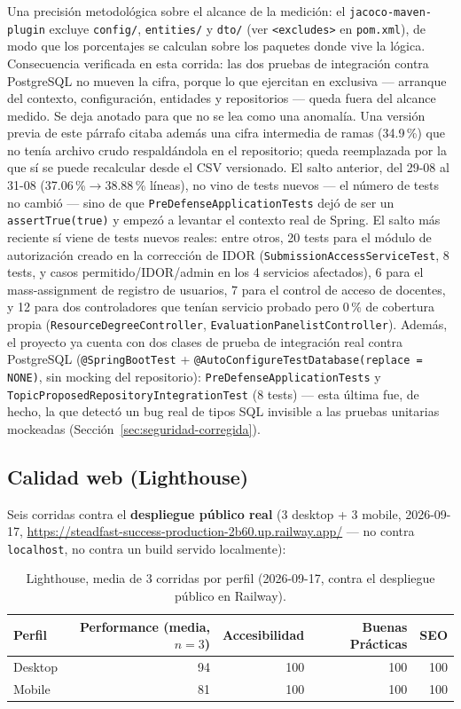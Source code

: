 Una precisión metodológica sobre el alcance de la medición: el \texttt{jacoco-maven-plugin} excluye
\texttt{config/}, \texttt{entities/} y \texttt{dto/} (ver \texttt{<excludes>} en \texttt{pom.xml}), de
modo que los porcentajes se calculan sobre los paquetes donde vive la lógica. Consecuencia verificada en
esta corrida: las dos pruebas de integración contra PostgreSQL no mueven la cifra, porque lo que
ejercitan en exclusiva --- arranque del contexto, configuración, entidades y repositorios --- queda fuera
del alcance medido. Se deja anotado para que no se lea como una anomalía.
Una versión previa de este párrafo citaba además una cifra intermedia de ramas (34.9\,\%) que no tenía
archivo crudo respaldándola en el repositorio; queda reemplazada por la que sí se puede recalcular desde
el CSV versionado.
El salto anterior, del 29-08 al 31-08 (37.06\,\%$\to$38.88\,\% líneas), no vino de tests nuevos --- el
número de tests no cambió --- sino de que \texttt{PreDefenseApplicationTests} dejó de ser un
\texttt{assertTrue(true)} y empezó a levantar el contexto real de Spring. El salto más reciente sí viene
de tests nuevos reales: entre otros, 20 tests para el módulo de autorización creado en la corrección de
IDOR (\texttt{SubmissionAccessServiceTest}, 8 tests, y casos permitido/IDOR/admin en los 4 servicios
afectados), 6 para el mass-assignment de registro de usuarios, 7 para el control de acceso de docentes, y
12 para dos controladores que tenían servicio probado pero 0\,\% de cobertura propia
(\texttt{ResourceDegreeController}, \texttt{EvaluationPanelistController}). Además, el proyecto ya
cuenta con dos clases de prueba de integración real contra PostgreSQL (\texttt{@SpringBootTest} +
\texttt{@AutoConfigureTestDatabase(replace = NONE)}, sin mocking del repositorio):
\texttt{PreDefenseApplicationTests} y \texttt{TopicProposedRepositoryIntegrationTest} (8 tests) ---
esta última fue, de hecho, la que detectó un bug real de tipos SQL invisible a las pruebas unitarias
mockeadas (Sección~\ref{sec:seguridad-corregida}).

\subsection{Calidad web (Lighthouse)}

Seis corridas contra el \textbf{despliegue público real} (3 desktop + 3 mobile, 2026-09-17,
\url{https://steadfast-success-production-2b60.up.railway.app/} --- no contra \texttt{localhost}, no
contra un build servido localmente):

\begin{table}[H]
\centering
\begin{tabular}{lrrrr}
\toprule
\textbf{Perfil} & \textbf{Performance (media, $n=3$)} & \textbf{Accesibilidad} & \textbf{Buenas Prácticas} & \textbf{SEO} \\
\midrule
Desktop & 94 & 100 & 100 & 100 \\
Mobile & 81 & 100 & 100 & 100 \\
\bottomrule
\end{tabular}
\caption{Lighthouse, media de 3 corridas por perfil (2026-09-17, contra el despliegue público en Railway).}
\end{table}

